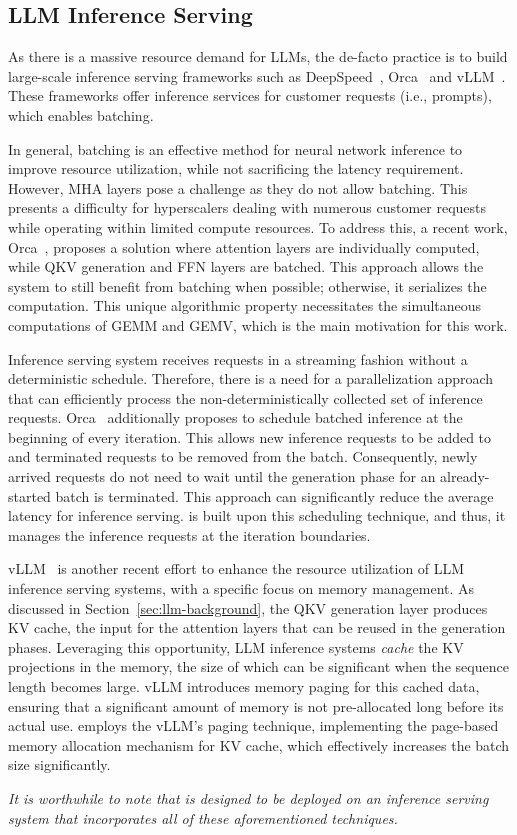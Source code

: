 \subsection{LLM Inference Serving}
%
As there is a massive resource demand for LLMs, the de-facto practice is to build large-scale inference serving frameworks such as DeepSpeed~\cite{deepspeed}, Orca~\cite{orca} and vLLM~\cite{vllm}.
%
These frameworks offer inference services for customer requests (i.e., prompts), which enables batching.
%

%
In general, batching is an effective method for neural network inference to improve resource utilization, while not sacrificing the latency requirement.
%
However, MHA layers pose a challenge as they do not allow batching. 
%
This presents a difficulty for hyperscalers dealing with numerous customer requests while operating within limited compute resources.
%
To address this, a recent work, Orca~\cite{orca}, proposes a solution where attention layers are individually computed, while QKV generation and FFN layers are batched. 
%
This approach allows the system to still benefit from batching when possible; otherwise, it serializes the computation.
%
This unique algorithmic property necessitates the simultaneous computations of GEMM and GEMV, which is the main motivation for this work.
%

%
Inference serving system receives requests in a streaming fashion without a deterministic schedule. 
%
Therefore, there is a need for a parallelization approach that can efficiently process the non-deterministically collected set of inference requests.
%
Orca~\cite{orca} additionally proposes to schedule batched inference at the beginning of every iteration. 
%
This allows new inference requests to be added to and terminated requests to be removed from the batch. 
%
Consequently, newly arrived requests do not need to wait until the generation phase for an already-started batch is terminated.
%
This approach can significantly reduce the average latency for inference serving.
%
\neupims is built upon this scheduling technique, and thus, it manages the inference requests at the iteration boundaries. 

%
%
vLLM~\cite{vllm} is another recent effort to enhance the resource utilization of LLM inference serving systems, with a specific focus on memory management.
%
As discussed in Section~\ref{sec:llm-background}, the QKV generation layer produces KV cache, the input for the attention layers that can be reused in the generation phases. 
%
Leveraging this opportunity, LLM inference systems \emph{cache} the KV projections in the memory, the size of which can be significant when the sequence length becomes large. 
%
vLLM introduces memory paging for this cached data, ensuring that a significant amount of memory is not pre-allocated long before its actual use.
%
\neupims employs the vLLM's paging technique, implementing the page-based memory allocation mechanism for KV cache, which effectively increases the batch size significantly. 

\emph{It is worthwhile to note that \neupims is designed to be deployed on an inference serving system that incorporates all of these aforementioned techniques.}
